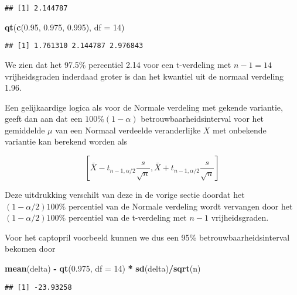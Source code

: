 \documentclass[12pt,dutch,coursenotes]{book}
\newenvironment{Shaded}{\begin{snugshade}}{\end{snugshade}}
\newcommand{\KeywordTok}[1]{\textcolor[rgb]{0.13,0.29,0.53}{\textbf{#1}}}
\newcommand{\DataTypeTok}[1]{\textcolor[rgb]{0.13,0.29,0.53}{#1}}
\newcommand{\DecValTok}[1]{\textcolor[rgb]{0.00,0.00,0.81}{#1}}
\newcommand{\FloatTok}[1]{\textcolor[rgb]{0.00,0.00,0.81}{#1}}
\newcommand{\StringTok}[1]{\textcolor[rgb]{0.31,0.60,0.02}{#1}}
\newcommand{\OperatorTok}[1]{\textcolor[rgb]{0.81,0.36,0.00}{\textbf{#1}}}
\newcommand{\NormalTok}[1]{#1}
\theoremstyle{definition}
\theoremstyle{definition}
\theoremstyle{definition}
\theoremstyle{remark}
\begin{document}
\begin{verbatim}
## [1] 2.144787
\end{verbatim}

\begin{Shaded}
\begin{Highlighting}[]
\KeywordTok{qt}\NormalTok{(}\KeywordTok{c}\NormalTok{(}\FloatTok{0.95}\NormalTok{, }\FloatTok{0.975}\NormalTok{, }\FloatTok{0.995}\NormalTok{), }\DataTypeTok{df =} \DecValTok{14}\NormalTok{)}
\end{Highlighting}
\end{Shaded}

\begin{verbatim}
## [1] 1.761310 2.144787 2.976843
\end{verbatim}

We zien dat het 97.5\% percentiel 2.14 voor een t-verdeling met
\(n-1=14\) vrijheidsgraden inderdaad groter is dan het kwantiel uit de
normaal verdeling 1.96.

Een gelijkaardige logica als voor de Normale verdeling met gekende
variantie, geeft dan aan dat een \(100\% (1-\alpha)\)
betrouwbaarheidsinterval voor het gemiddelde \(\mu\) van een Normaal
verdeelde veranderlijke \(X\) met onbekende variantie kan berekend
worden als

\begin{equation*}
\left[\bar{X} - t_{n-1, \alpha/2} \frac{s}{\sqrt{n}} , \bar{X} + t_{n-1,
\alpha/2} \frac{s}{\sqrt{n}}\right]
\end{equation*}

Deze uitdrukking verschilt van deze in de vorige sectie doordat het
\((1-\alpha/2)100\%\) percentiel van de Normale verdeling wordt
vervangen door het \((1-\alpha/2)100\%\) percentiel van de t-verdeling
met \(n-1\) vrijheidsgraden.

Voor het captopril voorbeeld kunnen we dus een 95\%
betrouwbaarheidsinterval bekomen door

\begin{Shaded}
\begin{Highlighting}[]
\KeywordTok{mean}\NormalTok{(delta) }\OperatorTok{-}\StringTok{ }\KeywordTok{qt}\NormalTok{(}\FloatTok{0.975}\NormalTok{, }\DataTypeTok{df =} \DecValTok{14}\NormalTok{) }\OperatorTok{*}\StringTok{ }\KeywordTok{sd}\NormalTok{(delta)}\OperatorTok{/}\KeywordTok{sqrt}\NormalTok{(n)}
\end{Highlighting}
\end{Shaded}

\begin{verbatim}
## [1] -23.93258
\end{verbatim}
\end{document}
